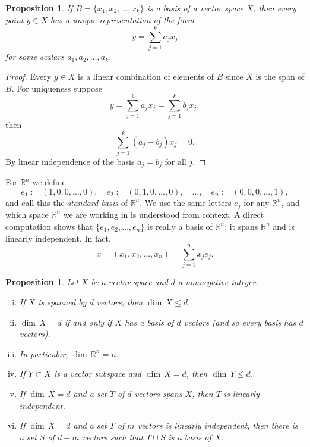 \documentclass[12pt]{book}
\newcommand{\R}{{\mathbb{R}}}
\newcommand{\myindex}[1]{#1\index{#1}}
\theoremstyle{plain}
\newtheorem{prop}[thm]{Proposition}
\theoremstyle{remark}
\theoremstyle{definition}
\theoremstyle{exercise}
\theoremstyle{example}
\begin{document}
\begin{prop}
If $B = \{ x_1, x_2, \ldots, x_k \}$ is a basis of a vector space $X$, then
every point $y \in X$ has a unique representation of the form
\begin{equation*}
y = \sum_{j=1}^k a_j x_j
\end{equation*}
for some scalars $a_1, a_2, \ldots, a_k$.
\end{prop}

\begin{proof}
Every $y \in X$ is a linear combination of elements of $B$
since $X$ is the span of $B$.  For uniqueness
suppose
\begin{equation*}
y = \sum_{j=1}^k a_j x_j = \sum_{j=1}^k b_j x_j ,
\end{equation*}
then
\begin{equation*}
\sum_{j=1}^k (a_j-b_j) x_j = 0 .
\end{equation*}
By linear independence of the basis $a_j = b_j$ for all $j$.
\end{proof}

For $\R^n$
we define
\begin{equation*}
e_1 := (1,0,0,\ldots,0) , \quad
e_2 := (0,1,0,\ldots,0) , \quad \ldots, \quad
e_n := (0,0,0,\ldots,1) ,
\end{equation*}
and call this the \emph{\myindex{standard basis}} of $\R^n$.
We use the same letters $e_j$ for any $\R^n$, and
which space $\R^n$ we are working in is understood from context.
A direct computation shows that $\{ e_1, e_2, \ldots, e_n \}$ is really
a basis of $\R^n$; it spans $\R^n$ and is
linearly independent.  In fact,
\begin{equation*}
x = (x_1,x_2,\ldots,x_n) = \sum_{j=1}^n x_j e_j .
\end{equation*}

\begin{prop} \label{mv:dimprop}
Let $X$ be a vector space and $d$ a nonnegative integer.
\begin{enumerate}[(i)]
\item \label{mv:dimprop:i}
If $X$ is spanned by $d$ vectors, then $\dim \, X \leq d$.
\item \label{mv:dimprop:ii}
$\dim \, X = d$ if and only if $X$ has a basis of $d$
vectors (and so every basis has $d$ vectors).
\item \label{mv:dimprop:iii}
In particular, $\dim \, \R^n = n$.
\item \label{mv:dimprop:iv}
If $Y \subset X$ is a vector subspace and $\dim \, X = d$,
then $\dim \, Y \leq d$.
\item \label{mv:dimprop:v}
If $\dim \, X = d$ and a set $T$ of $d$ vectors spans $X$,
then $T$ is linearly independent.
\item \label{mv:dimprop:vi}
If $\dim \, X = d$ and a set $T$ of $m$ vectors is
linearly independent, then there is a set $S$ of $d-m$
vectors such that $T \cup S$ is a basis of $X$.
\end{enumerate}
\end{prop}
\end{document}
